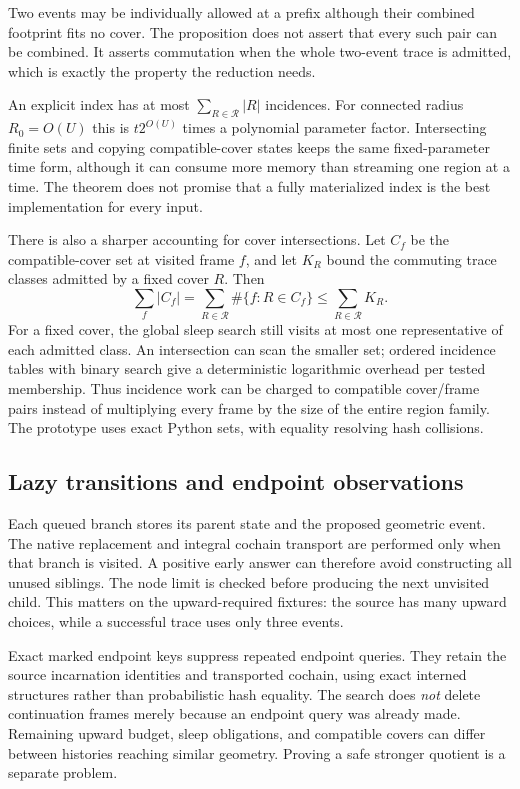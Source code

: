 Two events may be individually allowed at a prefix although their combined
footprint fits no cover. The proposition does not assert that every such
pair can be combined. It asserts commutation when the whole two-event trace
is admitted, which is exactly the property the reduction needs.

An explicit index has at most $\sum_{R\in\mathcal R}|R|$ incidences. For
connected radius $R_0=O(U)$ this is $t2^{O(U)}$ times a polynomial parameter
factor. Intersecting finite sets and copying compatible-cover states keeps
the same fixed-parameter time form, although it can consume more memory
than streaming one region at a time. The theorem does not promise that a
fully materialized index is the best implementation for every input.

There is also a sharper accounting for cover intersections. Let $C_f$ be
the compatible-cover set at visited frame $f$, and let $K_R$ bound the
commuting trace classes admitted by a fixed cover $R$. Then
\[
 \sum_f |C_f|
 =\sum_{R\in\mathcal R}\#\{f:R\in C_f\}
 \le\sum_{R\in\mathcal R}K_R.
\]
For a fixed cover, the global sleep search still visits at most one
representative of each admitted class. An intersection can scan the smaller
set; ordered incidence tables with binary search give a deterministic
logarithmic overhead per tested membership. Thus incidence work can be
charged to compatible cover/frame pairs instead of multiplying every
frame by the size of the entire region family. The prototype uses exact
Python sets, with equality resolving hash collisions.

\subsection{Lazy transitions and endpoint observations}

Each queued branch stores its parent state and the proposed geometric event.
The native replacement and integral cochain transport are performed only
when that branch is visited. A positive early answer can therefore avoid
constructing all unused siblings. The node limit is checked before producing
the next unvisited child. This matters on the upward-required fixtures:
the source has many upward choices, while a successful trace uses only
three events.

Exact marked endpoint keys suppress repeated endpoint queries. They retain
the source incarnation identities and transported cochain, using exact
interned structures rather than probabilistic hash equality. The search
does \emph{not} delete continuation frames merely because an endpoint query
was already made. Remaining upward budget, sleep obligations, and compatible
covers can differ between histories reaching similar geometry. Proving a
safe stronger quotient is a separate problem.

